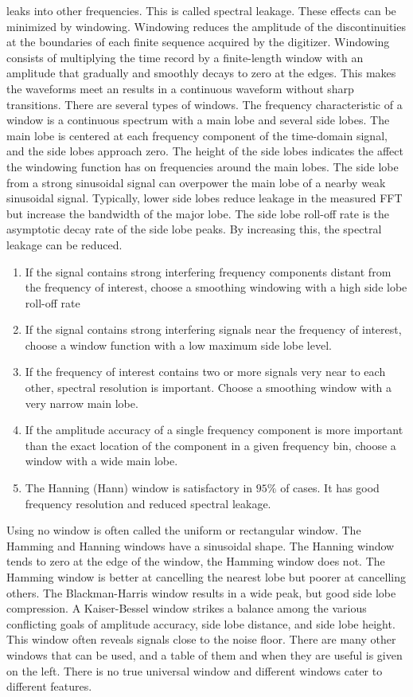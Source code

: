 \documentclass{article}
\theoremstyle{mystyle}
\begin{document}
leaks into other frequencies. This is called spectral leakage. These effects can be minimized by windowing. Windowing reduces the amplitude of the discontinuities at the boundaries of each finite sequence acquired by the digitizer. Windowing consists of multiplying the time record by a finite-length window with an amplitude that gradually and smoothly decays to zero at the edges. This makes the waveforms meet an results in a continuous waveform without sharp transitions. There are several types of windows. The frequency characteristic of a window is a continuous spectrum with a main lobe and several side lobes. The main lobe is centered at each frequency component of the time-domain signal, and the side lobes approach zero. The height of the side lobes indicates the affect the windowing function has on frequencies around the main lobes. The side lobe from a strong sinusoidal signal can overpower the main lobe of a nearby weak sinusoidal signal. Typically, lower side lobes reduce leakage in the measured FFT but increase the bandwidth of the major lobe. The side lobe roll-off rate is the asymptotic decay rate of the side lobe peaks. By increasing this, the spectral leakage can be reduced.
\begin{enumerate}
\item If the signal contains strong interfering frequency components distant from the frequency of interest, choose a smoothing windowing with a high side lobe roll-off rate
\item If the signal contains strong interfering signals near the frequency of interest, choose a window function with a low maximum side lobe level.
\item If the frequency of interest contains two or more signals very near to each other, spectral resolution is important. Choose a smoothing window with a very narrow main lobe.
\item If the amplitude accuracy of a single frequency component is more important than the exact location of the component in a given frequency bin, choose a window with a wide main lobe.
\item The Hanning (Hann) window is satisfactory in $95\%$ of cases. It has good frequency resolution and reduced spectral leakage. 
\end{enumerate}
Using no window is often called the uniform or rectangular window. The Hamming and Hanning windows have a sinusoidal shape. The Hanning window tends to zero at the edge of the window, the Hamming window does not. The Hamming window is better at cancelling the nearest lobe but poorer at cancelling others. The Blackman-Harris window results in a wide peak, but good side lobe compression. A Kaiser-Bessel window strikes a balance among the various conflicting goals of amplitude accuracy, side lobe distance, and side lobe height. This window often reveals signals close to the noise floor. There are many other windows that can be used, and a table of them and when they are useful is given on the left. There is no true universal window and different windows cater to different features.
\end{document}
